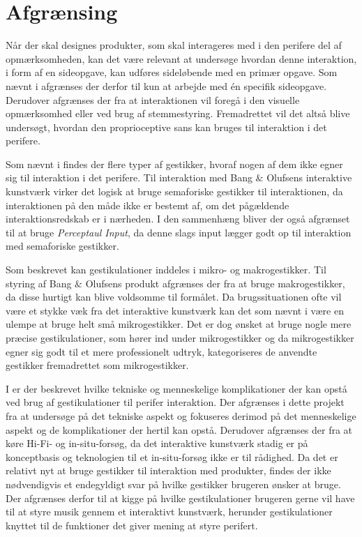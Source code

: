 \section{Afgrænsing}
\label{Afgraensning}
%
Når der skal designes produkter, som skal interageres med i den perifere del af opmærksomheden, kan det være relevant at undersøge hvordan denne interaktion, i form af en sideopgave, kan udføres sideløbende med en primær opgave. Som nævnt i  afgrænses der derfor til kun at arbejde med én specifik sideopgave. Derudover afgrænses der fra at interaktionen vil foregå i den visuelle opmærksomhed eller ved brug af stemmestyring. Fremadrettet vil det altså blive undersøgt, hvordan den proprioceptive sans kan bruges til interaktion i det perifere. 

Som nævnt i  findes der flere typer af gestikker, hvoraf nogen af dem ikke egner sig til interaktion i det perifere. Til interaktion med Bang $\&$ Olufsens interaktive kunstværk virker det logisk at bruge semaforiske gestikker til interaktionen, da interaktionen på den måde ikke er bestemt af, om det pågældende interaktionsredskab er i nærheden. I den sammenhæng bliver der også afgrænset til at bruge \textit{Perceptaul Input}, da denne slags input lægger godt op til interaktion med semaforiske gestikker.

Som beskrevet kan gestikulationer inddeles i mikro- og makrogestikker. Til styring af Bang $\&$ Olufsens produkt afgrænses der fra at bruge makrogestikker, da disse hurtigt kan blive voldsomme til formålet. Da brugssituationen ofte vil være et stykke væk fra det interaktive kunstværk kan det som nævnt i  være en ulempe at bruge helt små mikrogestikker. Det er dog ønsket at bruge nogle mere præcise gestikulationer, som hører ind under mikrogestikker og da mikrogestikker egner sig godt til et mere professionelt udtryk, \parencite[s. 10]{PDF:UsabilityofMicroVsMacroGestures} kategoriseres de anvendte gestikker fremadrettet som mikrogestikker. 

I  er der beskrevet hvilke tekniske og menneskelige komplikationer der kan opstå ved brug af gestikulationer til perifer interaktion. Der afgrænses i dette projekt fra at undersøge på det tekniske aspekt og fokuseres derimod på det menneskelige aspekt og de komplikationer der hertil kan opstå. Derudover afgrænses der fra at køre Hi-Fi- og in-situ-forsøg, da det interaktive kunstværk stadig er på konceptbasis og teknologien til et in-situ-forsøg ikke er til rådighed. Da det er relativt nyt at bruge gestikker til interaktion med produkter, findes der ikke nødvendigvis et endegyldigt svar på hvilke gestikker brugeren ønsker at bruge. Der afgrænses derfor til at kigge på hvilke gestikulationer brugeren gerne vil have til at styre musik gennem et interaktivt kunstværk, herunder gestikulationer knyttet til de funktioner det giver mening at styre perifert. 

